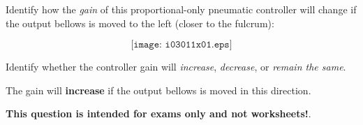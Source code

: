 

Identify how the {\it gain} of this proportional-only pneumatic controller will change if the output bellows is moved to the left (closer to the fulcrum):

$$\texttt{[image: i03011x01.eps]}$$

Identify whether the controller gain will {\it increase}, {\it decrease}, or {\it remain the same}.

\vskip 30pt







The gain will {\bf increase} if the output bellows is moved in this direction.







{\bf This question is intended for exams only and not worksheets!}.



